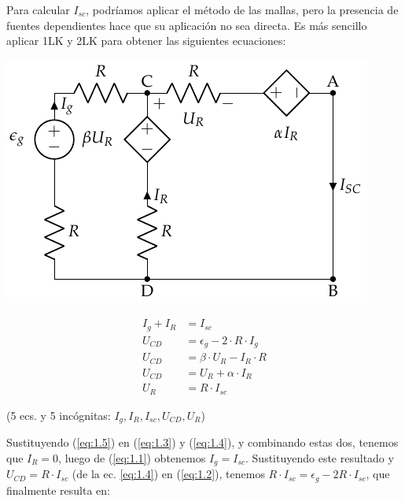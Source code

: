 \vspace{2mm}
Para calcular $I_{sc}$, podríamos aplicar el método de las mallas, pero la presencia de fuentes dependientes hace que su aplicación no sea directa. Es más sencillo aplicar 1LK y 2LK para obtener las siguientes ecuaciones:

\vspace{3mm}
\begin{minipage}{0.5\linewidth}
  \includegraphics[width=0.95\linewidth]{figuras/norton_corto.pdf}
\end{minipage}
\begin{minipage}{0.5\linewidth}

  \vspace{-5mm}
  \begin{align}
    I_g+ I_R &= I_{sc} \label{eq:1.1}\\    
    U_{CD} &= \epsilon_g - 2 \cdot R \cdot I_g \label{eq:1.2}\\
    U_{CD} &= \beta \cdot U_R - I_R \cdot R \label{eq:1.3}\\
    U_{CD} &= U_R + \alpha \cdot I_R \label{eq:1.4}\\
    U_R &= R \cdot I_{sc} \label{eq:1.5}
  \end{align}

  \vspace{-1mm}
    \begin{center}
      (5 ecs. y 5 incógnitas: $I_g, I_R, I_{sc}, U_{CD}, U_R$)
    \end{center}
\end{minipage}

\vspace{5mm}
Sustituyendo (\ref{eq:1.5}) en (\ref{eq:1.3}) y (\ref{eq:1.4}), y combinando estas dos, tenemos que $I_R=0$, luego de (\ref{eq:1.1}) obtenemos $I_g=I_{sc}$. Sustituyendo este resultado y $U_{CD}=R\cdot I_{sc}$ (de la ec. \ref{eq:1.4}) en (\ref{eq:1.2}), tenemos $R\cdot I_{sc}=\epsilon_g - 2R\cdot I_{sc}$, que finalmente resulta en: 

